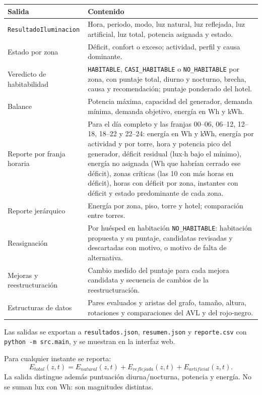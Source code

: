\documentclass[12pt,a4paper]{article}
\newcommand{\clase}[1]{\texttt{#1}}
\newcommand{\estado}[1]{\texttt{#1}}
\newcommand{\codigo}[1]{\texttt{#1}}
\begin{document}
\begin{center}\small
\begin{tabular}{p{}p{}}
\toprule
\textbf{Salida} & \textbf{Contenido}\\
\midrule
\clase{ResultadoIluminacion} & Hora, periodo, modo, luz natural, luz reflejada, luz artificial, luz total, potencia asignada y estado.\\
Estado por zona & Déficit, confort o exceso; actividad, perfil y causa dominante.\\
Veredicto de habitabilidad & \estado{HABITABLE}, \estado{CASI\_HABITABLE} o \estado{NO\_HABITABLE} por zona, con puntaje total, diurno y nocturno, brecha, causa y recomendación; puntaje ponderado del hotel.\\
Balance & Potencia máxima, capacidad del generador, demanda mínima, demanda objetivo, energía en Wh y kWh.\\
Reporte por franja horaria & Para el día completo y las franjas 00--06, 06--12, 12--18, 18--22 y 22--24: energía en Wh y kWh, energía por actividad y por torre, hora y potencia pico del generador, déficit residual (lux$\cdot$h bajo el mínimo), energía no asignada (Wh que habrían cerrado ese déficit), zonas críticas (las 10 con más horas en déficit), horas con déficit por zona, instantes con déficit y estado predominante de cada zona.\\
Reporte jerárquico & Energía por zona, piso, torre y hotel; comparación entre torres.\\
Reasignación & Por huésped en habitación \estado{NO\_HABITABLE}: habitación propuesta y su puntaje, candidatas revisadas y descartadas con motivo, o motivo de falta de alternativa.\\
Mejoras y reestructuración & Cambio medido del puntaje para cada mejora candidata y secuencia de cambios de la reestructuración.\\
Estructuras de datos & Pares evaluados y aristas del grafo, tamaño, altura, rotaciones y comparaciones del AVL y del rojo-negro.\\
\bottomrule
\end{tabular}
\end{center}

Las salidas se exportan a \codigo{resultados.json}, \codigo{resumen.json} y \codigo{reporte.csv} con \codigo{python -m src.main}, y se muestran en la interfaz web.

Para cualquier instante se reporta:
\begin{equation}
 E_{total}(z,t)=E_{natural}(z,t)+E_{reflejada}(z,t)+E_{artificial}(z,t).
 \label{eq:totalhotel}
\end{equation}
La salida distingue además puntuación diurna/nocturna, potencia y energía. No se suman lux con Wh: son magnitudes distintas.
\end{document}
